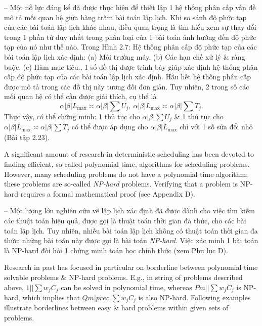\documentclass{article}
\begin{document}
\begin{itemize}
\begin{itemize}
        -- Một nỗ lực đáng kể đã được thực hiện để thiết lập 1 hệ thống phân cấp vấn đề mô tả mối quan hệ giữa hàng trăm bài toán lập lịch. Khi so sánh độ phức tạp của các bài toán lập lịch khác nhau, điều quan trọng là tìm hiểu xem sự thay đổi trong 1 phần tử duy nhất trong phân loại của 1 bài toán ảnh hưởng đến độ phức tạp của nó như thế nào. Trong {\sf Hình 2.7: Hệ thống phân cấp độ phức tạp của các bài toán lập lịch xác định: (a) Môi trường máy. (b) Các hạn chế xử lý \& ràng buộc. (c) Hàm mục tiêu.}, 1 số đồ thị được trình bày giúp xác định hệ thống phân cấp độ phức tạp của các bài toán lập lịch xác định. Hầu hết hệ thống phân cấp được mô tả trong các đồ thị này tương đối đơn giản. Tuy nhiên, 2 trong số các mối quan hệ có thể cần được giải thích, cụ thể là
        \begin{equation*}
            \alpha|\beta|L_{\max}\asymp\alpha|\beta|\sum U_j,\ \alpha|\beta|L_{\max}\asymp\alpha|\beta|\sum T_j.
        \end{equation*}
        Thực vậy, có thể chứng minh: 1 thủ tục cho $\alpha|\beta|\sum U_j$ \& 1 thủ tục cho $\alpha|\beta|L_{\max}\asymp\alpha|\beta|\sum T_j$ có thể được áp dụng cho $\alpha|\beta|L_{\max}$ chỉ với 1 số sửa đổi nhỏ (Bài tập 2.23).

        A significant amount of research in deterministic scheduling has been devoted to finding efficient, so-called polynomial time, algorithms for scheduling problems. However, many scheduling problems do not have a polynomial time algorithm; these problems are so-called {\it NP-hard} problems. Verifying that a problem is NP-hard requires a formal mathematical proof (see Appendix D).

        -- Một lượng lớn nghiên cứu về lập lịch xác định đã được dành cho việc tìm kiếm các thuật toán hiệu quả, được gọi là thuật toán thời gian đa thức, cho các bài toán lập lịch. Tuy nhiên, nhiều bài toán lập lịch không có thuật toán thời gian đa thức; những bài toán này được gọi là bài toán {\it NP-hard}. Việc xác minh 1 bài toán là NP-hard đòi hỏi 1 chứng minh toán học chính thức (xem Phụ lục D).

        Research in past has focused in particular on borderline between polynomial time solvable problems \& NP-hard problems. E.g., in string of problems described above, $1||\sum w_jC_j$ can be solved in polynomial time, whereas $Pm||\sum w_jC_j$ is NP-hard, which implies that $Qm|prec|\sum w_jC_j$ is also NP-hard. Following examples illustrate borderlines between easy \& hard problems within given sets of problems.


\end{itemize}
\end{itemize}
\end{document}
